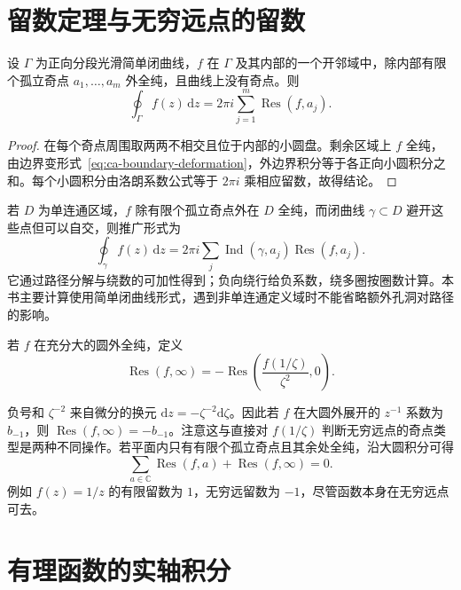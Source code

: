 \section{留数定理与无穷远点的留数}

\begin{theorem}[留数定理]
\label{thm:ca-residue}
设 $\Gamma$ 为正向分段光滑简单闭曲线，$f$ 在 $\Gamma$ 及其内部的一个开邻域中，除内部有限个孤立奇点 $a_1,\ldots,a_m$ 外全纯，且曲线上没有奇点。则
\begin{equation}
 \oint_\Gamma f(z)\,\mathrm dz
 =2\pi i\sum_{j=1}^m\operatorname{Res}(f,a_j).
 \label{eq:ca-residue-theorem}
\end{equation}
\end{theorem}
\begin{proof}
在每个奇点周围取两两不相交且位于内部的小圆盘。剩余区域上 $f$ 全纯，由边界变形式~\eqref{eq:ca-boundary-deformation}，外边界积分等于各正向小圆积分之和。每个小圆积分由洛朗系数公式等于 $2\pi i$ 乘相应留数，故得结论。
\end{proof}

若 $D$ 为单连通区域，$f$ 除有限个孤立奇点外在 $D$ 全纯，而闭曲线 $\gamma\subset D$ 避开这些点但可以自交，则推广形式为
\[
 \oint_\gamma f(z)\,\mathrm dz
 =2\pi i\sum_j\operatorname{Ind}(\gamma,a_j)\operatorname{Res}(f,a_j).
\]
它通过路径分解与绕数的可加性得到；负向绕行给负系数，绕多圈按圈数计算。本书主要计算使用简单闭曲线形式，遇到非单连通定义域时不能省略额外孔洞对路径的影响。

\begin{definition}[无穷远点的留数]
若 $f$ 在充分大的圆外全纯，定义
\begin{equation}
 \operatorname{Res}(f,\infty)
 =-\operatorname{Res}\left(\frac{f(1/\zeta)}{\zeta^2},0\right).
 \label{eq:ca-residue-infinity}
\end{equation}
\end{definition}

负号和 $\zeta^{-2}$ 来自微分的换元 $\mathrm dz=-\zeta^{-2}\mathrm d\zeta$。因此若 $f$ 在大圆外展开的 $z^{-1}$ 系数为 $b_{-1}$，则 $\operatorname{Res}(f,\infty)=-b_{-1}$。注意这与直接对 $f(1/\zeta)$ 判断无穷远点的奇点类型是两种不同操作。若平面内只有有限个孤立奇点且其余处全纯，沿大圆积分可得
\[
 \sum_{a\in\mathbb C}\operatorname{Res}(f,a)+\operatorname{Res}(f,\infty)=0.
\]
例如 $f(z)=1/z$ 的有限留数为 $1$，无穷远留数为 $-1$，尽管函数本身在无穷远点可去。

\section{有理函数的实轴积分}

